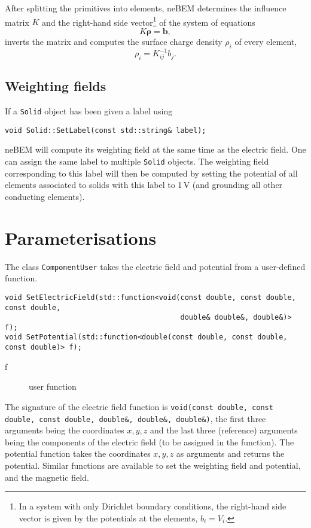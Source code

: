 After splitting the primitives into elements, 
neBEM determines the influence matrix $K$ and 
the right-hand side vector\footnote{In a system with only Dirichlet 
boundary conditions, the right-hand side vector is given by the 
potentials at the elements, $b_{i} = V_{i}$.}
of the system of equations
\begin{equation*}
K \boldsymbol{\rho} = \mathbf{b},
\end{equation*}
inverts the matrix and computes the surface charge density $\rho_{i}$ 
of every element,
\begin{equation*}
\rho_{i} = K^{-1}_{ij} b_{j}. 
\end{equation*}

\subsection{Weighting fields}
If a \texttt{Solid} object has been given a label using 
\begin{lstlisting}
void Solid::SetLabel(const std::string& label);
\end{lstlisting}
neBEM will compute its weighting field at the same time as 
the electric field.
One can assign the same label to multiple \texttt{Solid} objects.
The weighting field corresponding to this label will then be 
computed by setting the potential of all elements associated to solids 
with this label to 1\,V (and grounding all other conducting elements).

\section{Parameterisations}
The class \texttt{ComponentUser} takes the electric field and potential
from a user-defined function.
\begin{lstlisting}
void SetElectricField(std::function<void(const double, const double, const double, 
                                         double& double&, double&)> f);
void SetPotential(std::function<double(const double, const double, const double)> f);
\end{lstlisting}
\begin{description}
  \item[f] user function
\end{description}
The signature of the electric field function is \texttt{void(const double, const double, const double, double\&, double\&, double\&)}, 
the first three arguments being the coordinates $x, y, z$ and the 
last three (reference) arguments being the components of the electric 
field (to be assigned in the function).
The potential function takes the coordinates $x, y, z$ as arguments and
returns the potential. 
Similar functions are available to set the weighting field and potential,
and the magnetic field.

